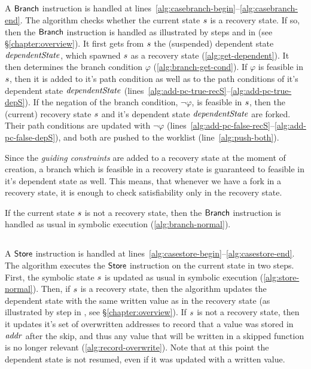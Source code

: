 \subsection{}
A $\mathsf{Branch}$ instruction is handled
at lines~\ref{alg:casebranch-begin}--\ref{alg:casebranch-end}.
The algorithm checks whether the current state $s$ is a recovery state.
If so, then the $\mathsf{Branch}$ instruction is
handled as illustrated by steps  and  in
 (see \S\ref{chapter:overview}).
It first gets from $s$ the (suspended) dependent state $\mathit{dependentState}$,
which spawned $s$ as a recovery state (\cref{alg:get-dependent}).
It then determines the branch condition $\varphi$ (\cref{alg:branch-get-cond}).
If $\varphi$ is feasible in $s$,
then it is added to it's path condition as well as to the path conditions
of it's dependent state $\mathit{dependentState}$ (lines~\ref{alg:add-pc-true-recS}--\ref{alg:add-pc-true-depS}).
If the negation of the branch condition, $\neg \varphi$, is feasible in $s$,
then the (current) recovery state $s$ and it's dependent state $\mathit{dependentState}$ are forked.
Their path conditions are updated with $\neg \varphi$ (lines~\ref{alg:add-pc-false-recS}--\ref{alg:add-pc-false-depS}),
and both are pushed to the worklist (line~\ref{alg:push-both}).

Since the \textit{guiding constraints} are added to a recovery state at the moment of creation,
a branch which is feasible in a recovery state is guaranteed to feasible in it's dependent state as well.
This means, that whenever we have a fork in a recovery state,
it is enough to check satisfiability only in the recovery state.

If the current state $s$ is not a recovery
state, then the $\mathsf{Branch}$ instruction is handled as usual in
symbolic execution (\cref{alg:branch-normal}).

\subsection{}
A $\mathsf{Store}$ instruction is handled
at lines~\ref{alg:casestore-begin}--\ref{alg:casestore-end}.
The algorithm executes the $\mathsf{Store}$ instruction on the
current state in two steps.
First, the symbolic state $s$ is updated as usual in symbolic execution (\cref{alg:store-normal}).
Then, if $s$ is a recovery state, then the algorithm
updates the dependent state with the same written value as in the recovery state
(as illustrated by step  in , see \S\ref{chapter:overview}).
If $s$ is not a recovery state,
then it updates it's set of overwritten addresses to record
that a value was stored in $\mathit{addr}$ after the skip,
and thus any value that will be written in a skipped function
is no longer relevant (\cref{alg:record-overwrite}). 
Note that at this point the dependent state is not resumed,
even if it was updated with a written value.

